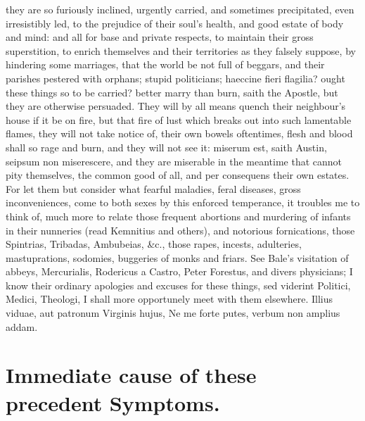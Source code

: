 {they are so furiously inclined, urgently carried, and sometimes
precipitated, even irresistibly led, to the prejudice of their soul's
health, and good estate of body and mind: and all for base and private
respects, to maintain their gross superstition, to enrich themselves
and their territories as they falsely suppose, by hindering some
marriages, that the world be not full of beggars, and their parishes
pestered with orphans; stupid politicians; haeccine fieri flagilia?
ought these things so to be carried? better marry than burn, saith the
Apostle, but they are otherwise persuaded. They will by all means
quench their neighbour's house if it be on fire, but that fire of lust
which breaks out into such lamentable flames, they will not take notice
of, their own bowels oftentimes, flesh and blood shall so rage and
burn, and they will not see it: miserum est, saith Austin, seipsum non
miserescere, and they are miserable in the meantime that cannot pity
themselves, the common good of all, and per consequens their own
estates. For let them but consider what fearful maladies, feral
diseases, gross inconveniences, come to both sexes by this enforced
temperance, it troubles me to think of, much more to relate those
frequent abortions and murdering of infants in their nunneries (read
Kemnitius and others), and notorious fornications, those
Spintrias, Tribadas, Ambubeias, \&c., those rapes, incests, adulteries,
mastuprations, sodomies, buggeries of monks and friars. See Bale's
visitation of abbeys, Mercurialis, Rodericus a Castro, Peter
Forestus, and divers physicians; I know their ordinary apologies and
excuses for these things, sed viderint Politici, Medici, Theologi, I
shall more opportunely meet with them elsewhere.
Illius viduae, aut patronum Virginis hujus,
Ne me forte putes, verbum non amplius addam.



\section{Immediate cause of these precedent Symptoms.}

}
